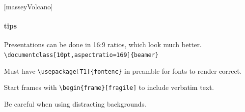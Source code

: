 \documentclass[10pt,aspectratio=43]{beamer}
\begin{document}
[masseyVolcano]

\begin{frame}[fragile] %
\framesubtitle{tips}
\setlength{\parskip}{\baselineskip}

Presentations can be done in  16:9 ratios, which look much better.\\
\verb|\documentclass[10pt,aspectratio=169]{beamer}|

Must have \verb|\usepackage[T1]{fontenc}| in preamble for fonts to render correct.

Start frames with \verb|\begin{frame}[fragile]| to include verbatim text.

Be careful when using distracting backgrounds. 

\end{frame}

\begin{frame}[plain]
\end{frame}
\end{document}
